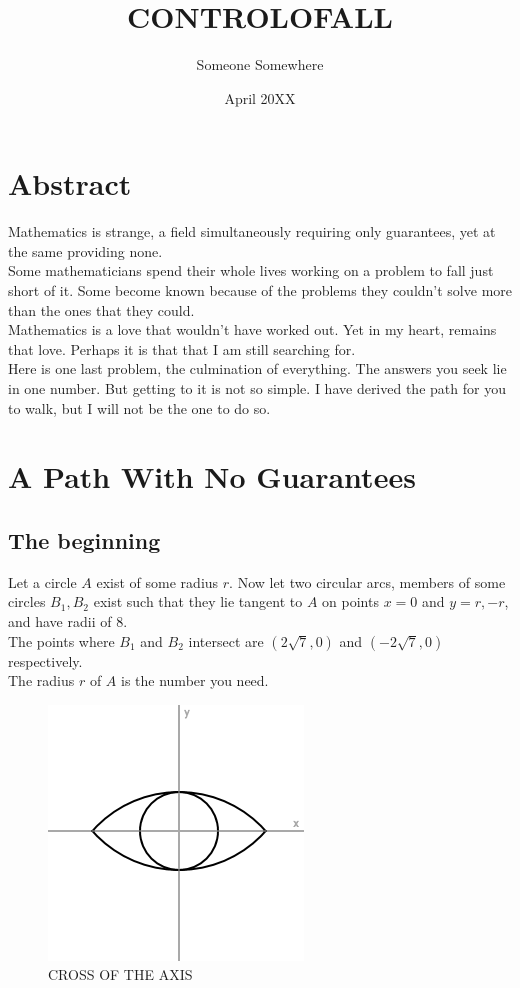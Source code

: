 \documentclass{article}
\title{CONTROLOFALL}
\author{Someone Somewhere}
\date{April 20XX}
\begin{document}
\maketitle

\section{Abstract}

Mathematics is strange, a field simultaneously requiring only guarantees, yet at the same providing none.\\

Some mathematicians spend their whole lives working on a problem to fall just short of it. Some become known because of the problems they couldn't solve more than the ones that they could.\\

Mathematics is a love that wouldn't have worked out. Yet in my heart, remains that love. Perhaps it is that that I am still searching for.\\

Here is one last problem, the culmination of everything. The answers you seek lie in one number. But getting to it is not so simple. I have derived the path for you to walk, but I will not be the one to do so.\\

\section{A Path With No Guarantees}
\subsection{The beginning}
Let a circle $A$ exist of some radius $r$. Now let two circular arcs, members of some circles $B_1,B_2$ exist such that they lie tangent to $A$ on points $x=0$ and $y=r,-r$, and have radii of 8.\\

The points where $B_1$ and $B_2$ intersect are $(2\sqrt{7},0)$ and $(-2\sqrt{7},0)$ respectively.\\

The radius $r$ of $A$ is the number you need.\\
\begin{figure}
    \centering
    \includegraphics[width=0.5\linewidth]{CROSSOFTHEAXIS.png}
    \caption{CROSS OF THE AXIS}
    \label{fig:enter-label}
\end{figure}
\end{document}
